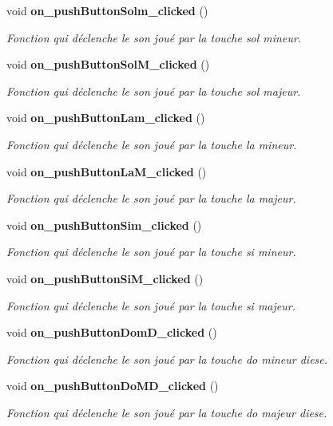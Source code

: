 \begin{DoxyCompactItemize}
void {\bf on\-\_\-push\-Button\-Solm\-\_\-clicked} ()
\begin{DoxyCompactList}\small\item\em Fonction qui déclenche le son joué par la touche sol mineur. \end{DoxyCompactList}\item 
void {\bf on\-\_\-push\-Button\-Sol\-M\-\_\-clicked} ()
\begin{DoxyCompactList}\small\item\em Fonction qui déclenche le son joué par la touche sol majeur. \end{DoxyCompactList}\item 
void {\bf on\-\_\-push\-Button\-Lam\-\_\-clicked} ()
\begin{DoxyCompactList}\small\item\em Fonction qui déclenche le son joué par la touche la mineur. \end{DoxyCompactList}\item 
void {\bf on\-\_\-push\-Button\-La\-M\-\_\-clicked} ()
\begin{DoxyCompactList}\small\item\em Fonction qui déclenche le son joué par la touche la majeur. \end{DoxyCompactList}\item 
void {\bf on\-\_\-push\-Button\-Sim\-\_\-clicked} ()
\begin{DoxyCompactList}\small\item\em Fonction qui déclenche le son joué par la touche si mineur. \end{DoxyCompactList}\item 
void {\bf on\-\_\-push\-Button\-Si\-M\-\_\-clicked} ()
\begin{DoxyCompactList}\small\item\em Fonction qui déclenche le son joué par la touche si majeur. \end{DoxyCompactList}\item 
void {\bf on\-\_\-push\-Button\-Dom\-D\-\_\-clicked} ()
\begin{DoxyCompactList}\small\item\em Fonction qui déclenche le son joué par la touche do mineur diese. \end{DoxyCompactList}\item 
void {\bf on\-\_\-push\-Button\-Do\-M\-D\-\_\-clicked} ()
\begin{DoxyCompactList}\small\item\em Fonction qui déclenche le son joué par la touche do majeur diese. \end{DoxyCompactList}\item 

\end{DoxyCompactItemize}
